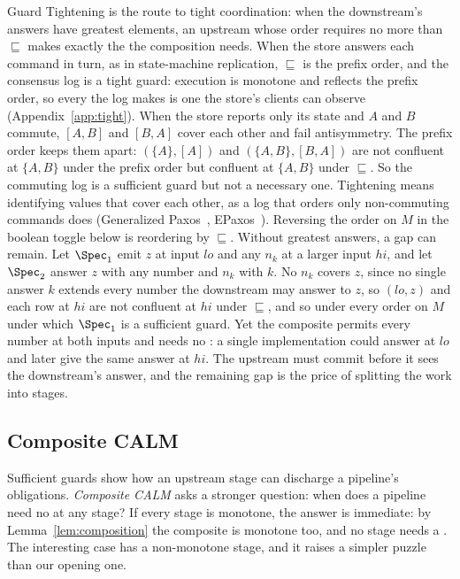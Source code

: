 Guard Tightening is the route to tight coordination: when the
downstream's answers have greatest elements, an upstream whose order requires
no more \commitments than $\sqsubseteq$ makes exactly the \commitments the
composition needs.  When the store answers each command in turn, as in
state-machine replication, $\sqsubseteq$ is the prefix order, and the
consensus log is a tight guard: execution is monotone and reflects the prefix
order, so every \commitment the log makes is one the store's clients can
observe (Appendix~\ref{app:tight}).  When the store reports only its state and
$A$ and $B$ commute, $[A,B]$ and $[B,A]$ cover each other and fail
antisymmetry.  The prefix order keeps them apart: $(\{A\},[A])$ and
$(\{A,B\},[B,A])$ are not confluent at $\{A,B\}$ under the prefix order but
confluent at $\{A,B\}$ under $\sqsubseteq$.  So the commuting log is a
sufficient guard but not a necessary one.  Tightening means identifying
values that cover each other, as a log that orders only non-commuting
commands does (Generalized Paxos~\cite{lamport2005generalized},
EPaxos~\cite{moraru2013epaxos}).  Reversing the order
on $M$ in the boolean toggle below is reordering by $\sqsubseteq$.  Without
greatest answers, a gap can remain.  Let $\Spec_1$ emit $z$ at input
$\mathit{lo}$ and any $n_k$ at a larger input $\mathit{hi}$, and let $\Spec_2$
answer $z$ with any number and $n_k$ with $k$.  No $n_k$ covers $z$, since no single
answer $k$ extends every number the downstream may answer to $z$, so $(\mathit{lo},z)$ and each row at $\mathit{hi}$ are not confluent at
$\mathit{hi}$ under $\sqsubseteq$, and so under every order on $M$ under which
$\Spec_1$ is a sufficient guard.  Yet the composite permits every number at both
inputs and needs no \commitment: a single implementation could answer at
$\mathit{lo}$ and later give the same answer at $\mathit{hi}$.  The upstream
must commit before it sees the downstream's answer, and the remaining gap is
the price of splitting the work into stages.

\subsection{Composite CALM}
\label{sec:composite-calm}

Sufficient guards show how an upstream
stage can discharge a pipeline's \commitment obligations.
\emph{Composite CALM} asks a stronger question: when does a pipeline need no
\commitment at any stage?  If every stage is monotone, the answer is immediate:
by Lemma~\ref{lem:composition} the composite is monotone too, and no stage needs
a \commitment.  The interesting case has a non-monotone stage, and it raises a
simpler puzzle than our opening one.

